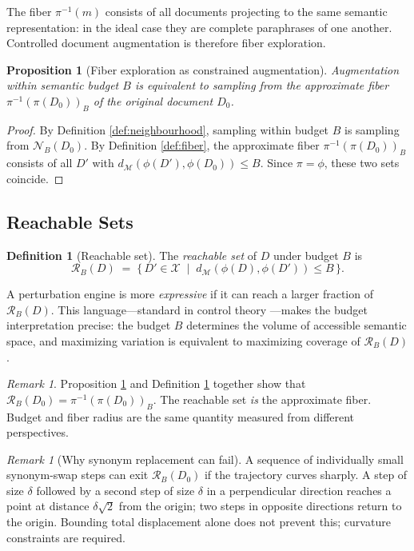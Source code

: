 \documentclass[12pt, a4paper]{article}
\theoremstyle{plain}
\newtheorem{proposition}[theorem]{Proposition}
\theoremstyle{definition}
\newtheorem{definition}[theorem]{Definition}
\theoremstyle{remark}
\newtheorem{remark}[theorem]{Remark}
\newcommand{\calX}{\mathcal{X}}
\newcommand{\calM}{\mathcal{M}}
\newcommand{\calR}{\mathcal{R}}
\newcommand{\vpi}{\pi}
\newcommand{\dM}{d_{\calM}}
\newcommand{\fiber}[1]{\vpi^{-1}(#1)}
\begin{document}
The fiber $\fiber{m}$ consists of all documents projecting to the same semantic
representation: in the ideal case they are complete paraphrases of one another.
Controlled document augmentation is therefore fiber exploration.

\begin{proposition}[Fiber exploration as constrained augmentation]
\label{prop:fiber}
Augmentation within semantic budget $B$ is equivalent to sampling from the
approximate fiber $\fiber{\vpi(D_0)}_B$ of the original document $D_0$.
\end{proposition}

\begin{proof}
By Definition \ref{def:neighbourhood}, sampling within budget $B$ is sampling
from $\mathcal{N}_B(D_0)$.  By Definition \ref{def:fiber}, the approximate
fiber $\fiber{\vpi(D_0)}_B$ consists of all $D'$ with
$\dM(\phi(D'), \phi(D_0)) \le B$.  Since $\vpi = \phi$, these two sets
coincide.
\end{proof}

\subsection{Reachable Sets}

\begin{definition}[Reachable set]
\label{def:reachable}
The \emph{reachable set} of $D$ under budget $B$ is
\[
   \calR_B(D) \;=\; \bigl\{\, D' \in \calX \;\mid\;
   \dM(\phi(D), \phi(D')) \le B \,\bigr\}.
\]
\end{definition}

A perturbation engine is more \emph{expressive} if it can reach a larger
fraction of $\calR_B(D)$.  This language---standard in control theory
\cite{liberzon2012optimal}---makes the budget interpretation precise: the
budget $B$ determines the volume of accessible semantic space, and
maximizing variation is equivalent to maximizing coverage of $\calR_B(D)$.

\begin{remark}
Proposition \ref{prop:fiber} and Definition \ref{def:reachable} together
show that $\calR_B(D_0) = \fiber{\vpi(D_0)}_B$.  The reachable set \emph{is}
the approximate fiber.  Budget and fiber radius are the same quantity measured
from different perspectives.
\end{remark}

\begin{remark}[Why synonym replacement can fail]
A sequence of individually small synonym-swap steps can exit $\calR_B(D_0)$
if the trajectory curves sharply.  A step of size $\delta$ followed by a
second step of size $\delta$ in a perpendicular direction reaches a point at
distance $\delta\sqrt{2}$ from the origin; two steps in opposite directions
return to the origin.  Bounding total displacement alone does not prevent
this; curvature constraints are required.
\end{remark}
\end{document}

